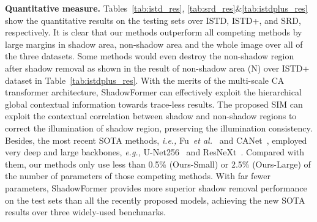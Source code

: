 \documentclass[letterpaper]{article} \usepackage{aaai23}  \usepackage{times}  \usepackage{helvet}  \usepackage{courier}  \usepackage[hyphens]{url}  \usepackage{graphicx} \urlstyle{rm} \def\UrlFont{\rm}  \usepackage{natbib}  \usepackage{caption} \frenchspacing  \setlength{\pdfpagewidth}{8.5in} \setlength{\pdfpageheight}{11in} \usepackage{algorithm}
\def\etal{\emph{et al.}}
\newcommand{\ie}{\textit{i.e., }}
\newcommand{\eg}{\textit{e.g., }}
\begin{document}
\noindent\textbf{Quantitative measure.}
Tables~\ref{tab:istd_res}, \ref{tab:srd_res}\&\ref{tab:istdplus_res} show the quantitative results on the testing sets over ISTD, ISTD+, and SRD, respectively.
It is clear that our methods outperform all competing methods by large margins in shadow area, non-shadow area and the whole image over all of the three datasets.
Some methods would even destroy the non-shadow region after shadow removal as shown in the result of non-shadow area (N) over ISTD+ dataset in Table~\ref{tab:istdplus_res}.
With the merits of the multi-scale CA transformer architecture, ShadowFormer can effectively exploit the hierarchical global contextual information towards trace-less results.
The proposed SIM can exploit the contextual correlation between shadow and non-shadow regions to correct the illumination of shadow region, preserving the illumination consistency.
Besides, the most recent SOTA methods, \ie Fu~\etal~\cite{fu2021auto} and CANet~\cite{chen2021canet}, employed very deep and large backbones, \eg U-Net256~\cite{ronneberger2015u} and ResNeXt~\cite{xie2017aggregated}.
Compared with them, our methods only use less than 0.5\% (Ours-Small) or 2.5\% (Ours-Large) of the number of parameters of those competing methods.
With far fewer parameters, ShadowFormer provides more superior shadow removal performance on the test sets
than all the recently proposed models,
achieving the new SOTA results over three widely-used benchmarks.
\end{document}
